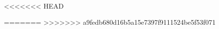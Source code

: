 \documentclass[../main.tex]{subfiles}
\begin{document}
\begin{subappendices}
%
%
%
%
<<<<<<< HEAD
\end{subappendices}
=======
>>>>>>> a9fedb680d16b5a15e7397f9111524be5f53f071
\end{document}
